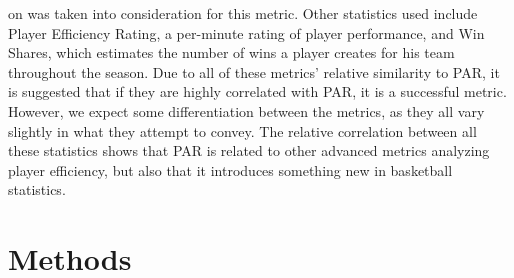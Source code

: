 \documentclass[12pt]{article}
\begin{document}
on was taken into consideration for this metric. Other statistics used include Player Efficiency Rating, a 
per-minute 
rating of player performance, and Win Shares, which estimates the number of wins a player creates 
for his team throughout the season. Due to all of these metrics' relative similarity to PAR, it is suggested 
that if they are highly correlated with PAR, it is a successful metric. However, we expect some differentiation 
between the metrics, as they all vary slightly in what they attempt to convey. The relative correlation 
between all these statistics shows that PAR is related to other advanced metrics analyzing player efficiency, 
but also that it introduces something new in basketball statistics.



\section{Methods}
\end{document}
